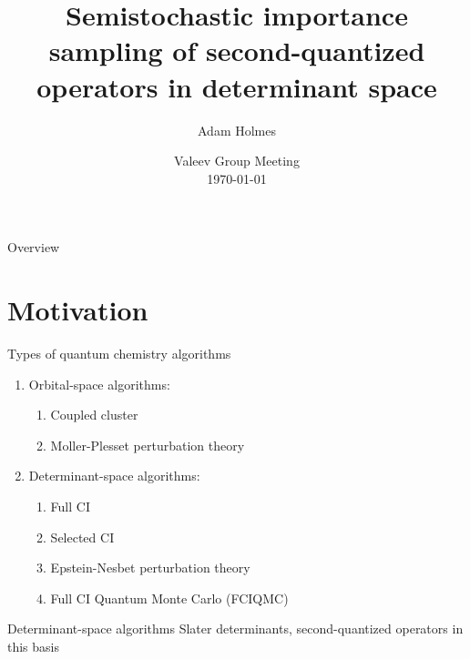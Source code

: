 \documentclass[amsmath]{beamer}
\begin{document}
	\title[Semistochastic importance sampling]{Semistochastic importance sampling of second-quantized operators in determinant space}
	\author[A. Holmes]{Adam Holmes}
	\date{Valeev Group Meeting\\\today} 
	
	\frame{\titlepage} 
	
	\begin{frame}{Overview}
		\tableofcontents[hideallsubsections]
	\end{frame}

\section{Motivation}
\begin{frame}{Types of quantum chemistry algorithms}
	\begin{enumerate}
		\item Orbital-space algorithms:
		\begin{enumerate}
			\item Coupled cluster
			\item Moller-Plesset perturbation theory
		\end{enumerate}
		\item Determinant-space algorithms:
		\begin{enumerate}
			\item Full CI
			\item Selected CI
			\item Epstein-Nesbet perturbation theory
			\item Full CI Quantum Monte Carlo (FCIQMC)
		\end{enumerate}
	\end{enumerate}
\end{frame}

\begin{frame}{Determinant-space algorithms}
	Slater determinants, second-quantized operators in this basis
\end{frame}
\end{document}
